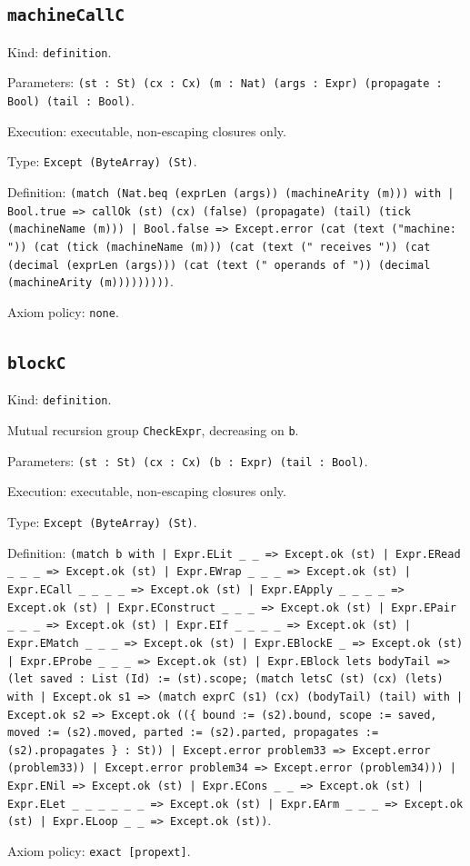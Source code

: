 \documentclass[11pt]{article}
\begin{document}
\subsection*{\texttt{machineCallC}}
\noindent Kind: \texttt{definition}.\par
\noindent Parameters: \texttt{(st : St) (cx : Cx) (m : Nat) (args : Expr) (propagate : Bool) (tail : Bool)}.\par
\noindent Execution: executable, non-escaping closures only.\par
\noindent Type: \texttt{Except (ByteArray) (St)}.\par
\noindent Definition: \texttt{(match (Nat.beq (exprLen (args)) (machineArity (m))) with | Bool.true => callOk (st) (cx) (false) (propagate) (tail) (tick (machineName (m))) | Bool.false => Except.error (cat (text ("machine: ")) (cat (tick (machineName (m))) (cat (text (" receives ")) (cat (decimal (exprLen (args))) (cat (text (" operands of ")) (decimal (machineArity (m)))))))))}.\par
\noindent Axiom policy: \texttt{none}.\par
\subsection*{\texttt{blockC}}
\noindent Kind: \texttt{definition}.\par
\noindent Mutual recursion group \texttt{CheckExpr}, decreasing on \texttt{b}.\par
\noindent Parameters: \texttt{(st : St) (cx : Cx) (b : Expr) (tail : Bool)}.\par
\noindent Execution: executable, non-escaping closures only.\par
\noindent Type: \texttt{Except (ByteArray) (St)}.\par
\noindent Definition: \texttt{(match b with | Expr.ELit \_ \_ => Except.ok (st) | Expr.ERead \_ \_ \_ => Except.ok (st) | Expr.EWrap \_ \_ \_ => Except.ok (st) | Expr.ECall \_ \_ \_ \_ => Except.ok (st) | Expr.EApply \_ \_ \_ \_ => Except.ok (st) | Expr.EConstruct \_ \_ \_ => Except.ok (st) | Expr.EPair \_ \_ \_ => Except.ok (st) | Expr.EIf \_ \_ \_ \_ => Except.ok (st) | Expr.EMatch \_ \_ \_ => Except.ok (st) | Expr.EBlockE \_ => Except.ok (st) | Expr.EProbe \_ \_ \_ => Except.ok (st) | Expr.EBlock lets bodyTail => (let saved : List (Id) := (st).scope; (match letsC (st) (cx) (lets) with | Except.ok s1 => (match exprC (s1) (cx) (bodyTail) (tail) with | Except.ok s2 => Except.ok ((\{ bound := (s2).bound, scope := saved, moved := (s2).moved, parted := (s2).parted, propagates := (s2).propagates \} : St)) | Except.error problem33 => Except.error (problem33)) | Except.error problem34 => Except.error (problem34))) | Expr.ENil => Except.ok (st) | Expr.ECons \_ \_ => Except.ok (st) | Expr.ELet \_ \_ \_ \_ \_ \_ => Except.ok (st) | Expr.EArm \_ \_ \_ => Except.ok (st) | Expr.ELoop \_ \_ => Except.ok (st))}.\par
\noindent Axiom policy: \texttt{exact [propext]}.\par
\end{document}
